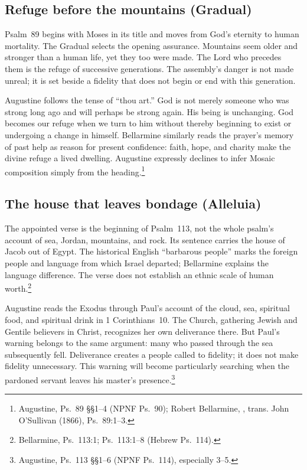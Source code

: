\subsection{Refuge before the mountains (Gradual)}
Psalm~89 begins with Moses in its title and moves from God's eternity
to human mortality. The Gradual selects the opening assurance. Mountains
seem older and stronger than a human life, yet they too were made. The
Lord who precedes them is the refuge of successive generations. The
assembly's danger is not made unreal; it is set beside a fidelity that
does not begin or end with this generation.

Augustine follows the tense of ``thou art.'' God is not merely someone
who was strong long ago and will perhaps be strong again. His being is
unchanging. God becomes our refuge when we turn to him without thereby
beginning to exist or undergoing a change in himself. Bellarmine similarly
reads the prayer's memory of past help as reason for present confidence:
faith, hope, and charity make the divine refuge a lived dwelling.
Augustine expressly declines to infer Mosaic composition simply from
the heading.\footnote{Augustine, Ps.~89 \S\S1--4 (NPNF Ps.~90);
Robert Bellarmine, , trans.
John O'Sullivan (1866), Ps.~89:1--3.}

\subsection{The house that leaves bondage (Alleluia)}
The appointed verse is the beginning of Psalm~113, not the whole psalm's
account of sea, Jordan, mountains, and rock. Its sentence carries the
house of Jacob out of Egypt. The historical English ``barbarous people''
marks the foreign people and language from which Israel departed;
Bellarmine explains the language difference. The verse does not establish
an ethnic scale of human worth.\footnote{Bellarmine, Ps.~113:1;
Ps.~113:1--8 (Hebrew Ps.~114).}

Augustine reads the Exodus through Paul's account of the cloud, sea,
spiritual food, and spiritual drink in 1 Corinthians~10. The Church,
gathering Jewish and Gentile believers in Christ, recognizes her own
deliverance there. But Paul's warning belongs to the same argument:
many who passed through the sea subsequently fell. Deliverance creates
a people called to fidelity; it does not make fidelity unnecessary.
This warning will become particularly searching when the pardoned
servant leaves his master's presence.\footnote{Augustine, Ps.~113
\S\S1--6 (NPNF Ps.~114), especially 3--5.}

